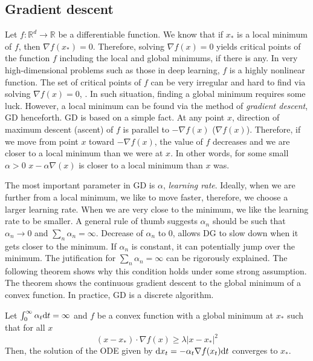 \documentclass[11pt]{book}
\newcommand{\dd}{\text{\normalfont d}}
\newcommand{\dt}{\text{\normalfont d}t}
\begin{document}
\subsection{Gradient descent}
Let $f:\mathbb{R}^d\to\mathbb{R}$ be a differentiable function. We know that if $x_*$ is a local minimum of $f$, then $\nabla f(x_*)=0$. Therefore, solving $\nabla f(x)=0$ yields critical points of the function $f$ including the local and global minimums, if there is any. In very high-dimensional problems such as those in deep learning, $f$ is a highly nonlinear function. The set of critical points of $f$ can be very irregular and hard to find via solving $\nabla f(x)=0$, \citet{PRV21}. In such situation, finding a global minimum requires some luck. However, a local minimum can be found via the method of \emph{gradient descent}, GD henceforth. 
GD is based on a simple fact. At any point $x$, direction of maximum descent (ascent) of $f$ is parallel to $-\nabla f(x)$ ($\nabla f(x)$). Therefore, if we move from point $x$ toward $-\nabla f(x)$, the value of $f$ decreases and we are closer to a local minimum than we were at $x$. In other words, for some small $\alpha>0$ $x-\alpha\nabla(x)$ is closer to a local minimum than $x$ was. 
\begin{algorithm}
        \caption{Gradient descent}
        \label{alg:gd}
\end{algorithm}
The most important parameter in GD is $\alpha$, \emph{learning rate}. Ideally, when we are further from a local minimum, we like to move faster, therefore, we choose a larger learning rate. When we are very close to the minimum, we like the learning rate to be smaller. A general rule of thumb suggests $\alpha_n$ should be such that $\alpha_n\to0$ and $\sum_n\alpha_n=\infty$. Decrease of $\alpha_n$ to 0, allows DG to slow down when it gets closer to the minimum. If $\alpha_n$ is constant, it can potentially jump over the minimum. The jutification for $\sum_n\alpha_n=\infty$ can be rigorously explained. The following theorem shows why this condition holds under some strong assumption. The theorem shows the continuous gradient descent to the global minimum of a convex function. In practice, GD is a discrete algorithm. 
\begin{thm}
    Let $\int_0^\infty\alpha_t\dt=\infty$ and $f$ be a convex function with a global minimum at $x_*$ such that for all $x$
    \[
    (x-x_*)\cdot \nabla f(x) \ge \lambda |x-x_*|^2
    \]
    Then, the solution of the ODE given by $\dd x_t = -\alpha_t \nabla f(x_t) \dt$ converges to $x_*$. 
\end{thm}
\end{document}
